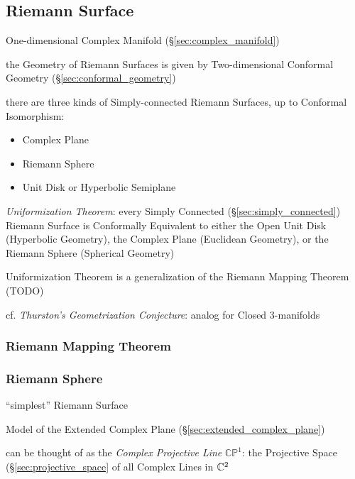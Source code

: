 \subsection{Riemann Surface}\label{sec:riemann_surface}

One-dimensional Complex Manifold (\S\ref{sec:complex_manifold})

the Geometry of Riemann Surfaces is given by Two-dimensional Conformal
Geometry (\S\ref{sec:conformal_geometry})

there are three kinds of Simply-connected Riemann Surfaces, up to Conformal
Isomorphism:
\begin{itemize}
  \item Complex Plane
  \item Riemann Sphere
  \item Unit Disk or Hyperbolic Semiplane
\end{itemize}

\emph{Uniformization Theorem}: every Simply Connected
(\S\ref{sec:simply_connected}) Riemann Surface is Conformally Equivalent to
either the Open Unit Disk (Hyperbolic Geometry), the Complex Plane (Euclidean
Geometry), or the Riemann Sphere (Spherical Geometry)

Uniformization Theorem is a generalization of the Riemann Mapping Theorem (TODO)

\fist cf. \emph{Thurston's Geometrization Conjecture}: analog for Closed
3-manifolds



\subsubsection{Riemann Mapping Theorem}
\label{sec:riemann_mapping_theorem}

\subsubsection{Riemann Sphere}\label{sec:riemann_sphere}

``simplest'' Riemann Surface

Model of the Extended Complex Plane
(\S\ref{sec:extended_complex_plane})

can be thought of as the \emph{Complex Projective Line}
$\mathbb{CP}^1$: the Projective Space (\S\ref{sec:projective_space} of
all Complex Lines in $\mathbb{C}^2$

